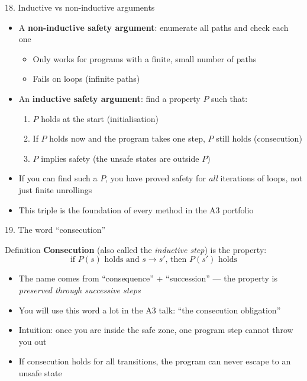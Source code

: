 \documentclass[aspectratio=169]{beamer}
\begin{document}
\begin{frame}{18. Inductive vs non-inductive arguments}
\begin{itemize}
  \item A \textbf{non-inductive safety argument}: enumerate all paths and check each one
    \begin{itemize}
      \item Only works for programs with a finite, small number of paths
      \item Fails on loops (infinite paths)
    \end{itemize}
  \item An \textbf{inductive safety argument}: find a property \(P\) such that:
    \begin{enumerate}
      \item \(P\) holds at the start (initialisation)
      \item If \(P\) holds now and the program takes one step, \(P\) still holds (consecution)
      \item \(P\) implies safety (the unsafe states are outside \(P\))
    \end{enumerate}
  \item If you can find such a \(P\), you have proved safety for \emph{all} iterations of loops, not just finite unrollings
  \item This triple is the foundation of every method in the A3 portfolio
\end{itemize}
\end{frame}

\begin{frame}{19. The word ``consecution''}
\begin{block}{Definition}
\textbf{Consecution} (also called the \emph{inductive step}) is the property:
\[
\text{if } P(s) \text{ holds and } s \to s' \text{, then } P(s') \text{ holds}
\]
\end{block}
\begin{itemize}
  \item The name comes from ``consequence'' + ``succession'' --- the property is \emph{preserved through successive steps}
  \item You will use this word a lot in the A3 talk: ``the consecution obligation''
  \item Intuition: once you are inside the safe zone, one program step cannot throw you out
  \item If consecution holds for all transitions, the program can never escape to an unsafe state
\end{itemize}
\end{frame}
\end{document}
